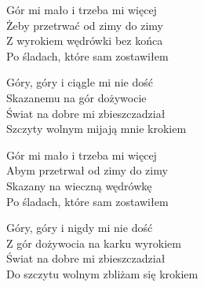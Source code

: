\begin{text}
    \vin Gór mi mało i trzeba mi więcej\\
    \vin Żeby przetrwać od zimy do zimy\\
    \vin Z wyrokiem wędrówki bez końca\\
    \vin Po śladach, które sam zostawiłem

    \vin Góry, góry i ciągle mi nie dość\\
    \vin Skazanemu na gór dożywocie\\
    \vin Świat na dobre mi zbieszczadział\\
    \vin Szczyty wolnym mijają mnie krokiem

    \vin Gór mi mało i trzeba mi więcej\\
    \vin Abym przetrwał od zimy do zimy\\
    \vin Skazany na wieczną wędrówkę\\
    \vin Po śladach, które sam zostawiłem

    \vin Góry, góry i nigdy mi nie dość\\
    \vin Z gór dożywocia na karku wyrokiem\\
    \vin Świat na dobre mi zbieszczadział\\
    \vin Do szczytu wolnym zbliżam się krokiem
\end{text}